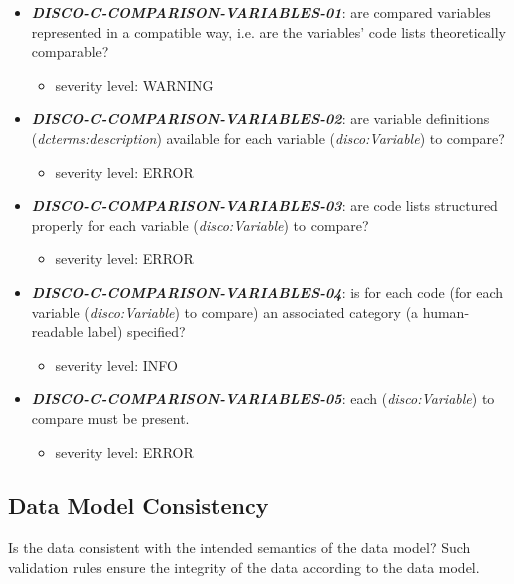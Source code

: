 \documentclass{llncs}
\begin{document}
\begin{itemize}
	\item \textbf{{\em DISCO-C-COMPARISON-VARIABLES-01}}: 
	are compared variables represented in a compatible way, i.e. are the variables' code lists theoretically comparable?
		\begin{itemize}
		\item severity level: WARNING
	\end{itemize}
	\item \textbf{{\em DISCO-C-COMPARISON-VARIABLES-02}}: 
	are variable definitions (\emph{dcterms:description}) available for each variable (\emph{disco:Variable}) to compare?
		\begin{itemize}
		\item severity level: ERROR
	\end{itemize}
	\item \textbf{{\em DISCO-C-COMPARISON-VARIABLES-03}}:
	are code lists structured properly for each variable (\emph{disco:Variable}) to compare?
		\begin{itemize}
		\item severity level: ERROR
	\end{itemize}
	\item \textbf{{\em DISCO-C-COMPARISON-VARIABLES-04}}:
	is for each code (for each variable (\emph{disco:Variable}) to compare) an associated category (a human-readable label) specified?
		\begin{itemize}
		\item severity level: INFO
	\end{itemize}
	\item \textbf{{\em DISCO-C-COMPARISON-VARIABLES-05}}:
	each (\emph{disco:Variable}) to compare must be present.
	\begin{itemize}
		\item severity level: ERROR
	\end{itemize}
\end{itemize}

\subsection{Data Model Consistency}
Is the data consistent with the intended semantics of the data model?
Such validation rules ensure the integrity of the data according to the data model.
\end{document}
